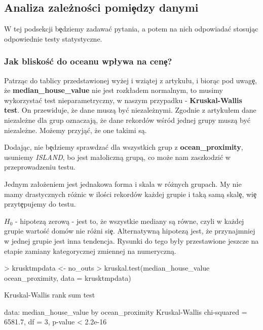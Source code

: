 \documentclass{article}
\begin{document}
\subsection{Analiza zależności pomi\c edzy danymi}
\quad W tej podsekcji b\c edziemy zadawa\'c pytania, a potem na nich odpowiada\'c stosując odpowiednie testy statystyczne.

\subsubsection{Jak bliskoś\'c do oceanu wp\l ywa na cen\c e?}
\quad Patrząc do tablicy przedstawionej wyżej i wziątej z artyku\l u, i biorąc pod uwag\c e, że \textbf{median\_house\_value} nie jest rozk\l adem normalnym, to musimy wykorzysta\'c test nieparametryczny, w naszym przypadku - \textbf{Kruskal-Wallis test}. On przewiduje, że dane muszą by\'c niezależnymi. Zgodnie z artyku\l em dane niezależne dla grup oznaczają, że dane rekordów wśród jednej grupy muszą by\'c niezależne. Możemy przyją\'c, że one takimi są.

\noindent
\quad Dodając, nie b\c edziemy sprawdza\'c dla wszystkich grup z \textbf{ocean\_proximity}, usuniemy \textit{ISLAND}, bo jest ma\l oliczną grupą, co może nam zaszkodzi\'c w przeprowadzeniu testu.

\noindent
\quad Jednym za\l ożeniem jest jednakowa forma i skala w różnych grupach. My nie mamy drastycznych różnic w ilości rekordów każdej grupie i taką samą skal\c e, wi\c e przyt\c epujemy do testu.

\noindent
\quad \textbf{$H_0$} - hipotezą zerową - jest to, że wszystkie mediany są równe, czyli w każdej grupie wartoś\'c domów nie różni si\c e. Alternatywną hipotezą jest, że przynajmniej w jednej grupie jest inna tendencja. Rysunki do tego by\l y przestawione jeszcze na etapie zamiany kategorycznej zmiennej na numeryczną.

\begin{Schunk}
\begin{Sinput}
> krusktmpdata <- no_outs %>% filter(ocean_proximity != 5)
> kruskal.test(median_house_value ~ ocean_proximity, data = krusktmpdata)
\end{Sinput}
\begin{Soutput}
	Kruskal-Wallis rank sum test

data:  median_house_value by ocean_proximity
Kruskal-Wallis chi-squared = 6581.7, df = 3, p-value < 2.2e-16
\end{Soutput}
\end{Schunk}
\end{document}
